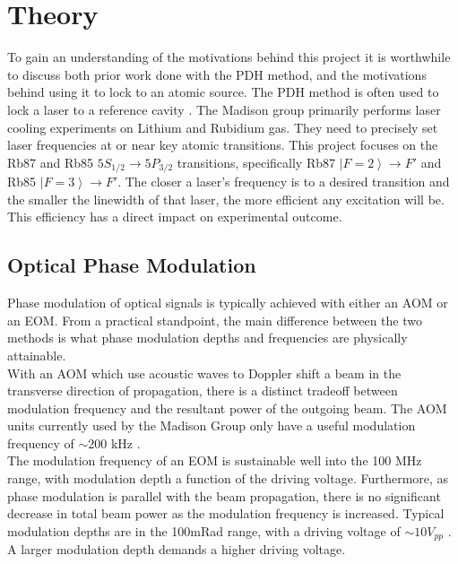 \newpage
\section{Theory}
\label{sec:theory}

To gain an understanding of the motivations behind this project it is worthwhile to discuss both prior work done with the PDH method, and the motivations behind using it to lock to an atomic source.  The PDH method is often used to lock a laser to a reference cavity \cite{black1998}.  The Madison group primarily performs laser cooling experiments on Lithium and Rubidium gas.  They need to precisely set laser frequencies at or near key atomic transitions. This project focuses on the Rb87 and Rb85 $5S_{1/2} \rightarrow 5P_{3/2}$ transitions, specifically Rb87 $\left|F=2\right\rangle \rightarrow F'$ and Rb85 $\left|F=3\right\rangle \rightarrow F'$.  The closer a laser's frequency is to a desired transition and the smaller the linewidth of that laser, the more efficient any excitation will be.  This efficiency has a direct impact on experimental outcome.


\subsection{Optical Phase Modulation}

Phase modulation of optical signals is typically achieved with either an AOM or an EOM. From a practical standpoint, the main difference between the two methods is what phase modulation depths and frequencies are physically attainable. \\

With an AOM which use acoustic waves to Doppler shift a beam in the transverse direction of propagation, there is a distinct tradeoff between modulation frequency and the resultant power of the outgoing beam.  The AOM units currently used by the Madison Group only have a useful modulation frequency of $\sim$200 kHz \cite{madison14}. \\

The modulation frequency of an EOM is sustainable well into the 100 MHz range, with modulation depth a function of the driving voltage. Furthermore, as phase modulation is parallel with the beam propagation, there is no significant decrease in total beam power as the modulation frequency is increased. Typical modulation depths are in the 100mRad range, with a driving voltage of $\sim 10 V_{pp}$ \cite{thorlabs_eom}. A larger modulation depth demands a higher driving voltage. \\


